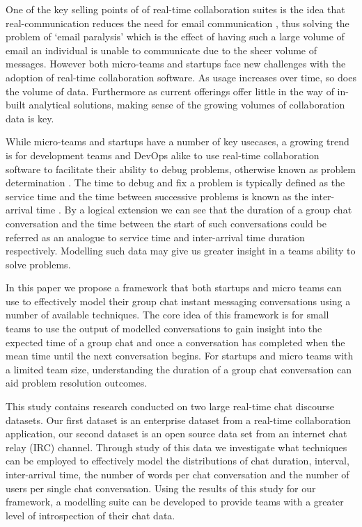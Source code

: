 \documentclass[conference]{IEEEtran}
\begin{document}
One of the key selling points of of real-time collaboration suites is the idea that real-communication reduces the need for email communication \cite{emailclutter}, thus solving the problem of `email paralysis' \cite{emailparal} which is the effect of having such a large volume of email an individual is unable to communicate due to the sheer volume of messages. However both micro-teams and startups face new challenges with the adoption of real-time collaboration software. As usage increases over time, so does the volume of data. Furthermore as current offerings offer little in the way of in-built analytical solutions, making sense of the growing volumes of collaboration data is key.  

While micro-teams and startups have a number of key usecases, a growing trend is for development teams and DevOps alike to use real-time collaboration software to facilitate their ability to debug problems, otherwise known as problem determination \cite{devslack} \cite{devopsslack}. The time to debug and fix a problem is typically defined as the service time and the time between successive problems is known as the inter-arrival time \cite{kleinrock1975queuing}. By a logical extension we can see that the duration of a group chat conversation and the time between the start of such conversations could be referred as an analogue to service time and inter-arrival time duration respectively. Modelling such data may give us greater insight in a teams ability to solve problems. \par 

In this paper we propose a framework that both startups and micro teams can use to effectively model their group chat instant messaging conversations using a number of available techniques. The core idea of this framework is for small teams to use the output of modelled conversations to gain insight into the expected time of a group chat and once a conversation has completed when the mean time until the next conversation begins. For startups and micro teams with a limited team size, understanding the duration of a group chat conversation can aid problem resolution outcomes. \par

This study contains research conducted on two large real-time chat discourse datasets. Our first dataset is an enterprise dataset from a real-time collaboration application, our second dataset is an open source data set from an internet chat relay (IRC) channel. Through study of this data we investigate what techniques can be employed to effectively model the distributions of chat duration, interval, inter-arrival time, the number of words per chat conversation and the number of  users per single chat conversation. Using the results of this study for our framework, a modelling suite can be developed to provide teams with a greater level of introspection of their chat data. \par
\end{document}
